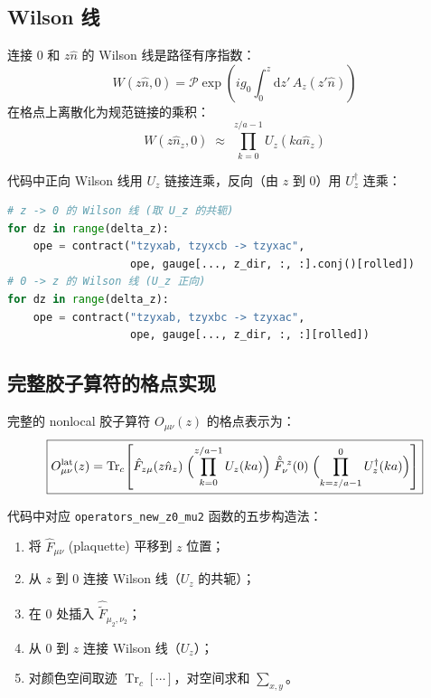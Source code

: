 \documentclass[11pt,a4paper]{ctexart}
\newcommand{\tr}{\operatorname{Tr}}
\begin{document}
\subsection{Wilson 线}

连接 $0$ 和 $z\hat{n}$ 的 Wilson 线是路径有序指数：
\begin{equation}
W(z\hat{n}, 0) = \mathcal{P} \exp\!\left( i g_0 \int_{0}^{z} \mathrm{d}z' \, A_z(z'\hat{n}) \right)
\end{equation}
在格点上离散化为规范链接的乘积：
\begin{equation}\label{eq:wilson_line}
W(z\hat{n}_z, 0) \;\approx\; \prod_{k=0}^{z/a-1} U_z(k a \hat{n}_z)
\end{equation}

代码中正向 Wilson 线用 $U_z$ 链接连乘，反向（由 $z$ 到 $0$）用 $U_z^{\dagger}$ 连乘：
\begin{lstlisting}[language=Python]
# z -> 0 的 Wilson 线 (取 U_z 的共轭)
for dz in range(delta_z):
    ope = contract("tzyxab, tzyxcb -> tzyxac",
                   ope, gauge[..., z_dir, :, :].conj()[rolled])
# 0 -> z 的 Wilson 线 (U_z 正向)
for dz in range(delta_z):
    ope = contract("tzyxab, tzyxbc -> tzyxac",
                   ope, gauge[..., z_dir, :, :][rolled])
\end{lstlisting}

\subsection{完整胶子算符的格点实现}

完整的 nonlocal 胶子算符 $O_{\mu\nu}(z)$ 的格点表示为：
\begin{equation}\label{eq:full_operator}
\boxed{
O_{\mu\nu}^{\text{lat}}(z) = \tr_c\!\left[
\hat{F}_{z\mu}(z\hat{n}_z) \;
\Bigl( \prod_{k=0}^{z/a-1} U_z(k a) \Bigr) \;
\hat{\tilde{F}}_{\nu}^{\;z}(0) \;
\Bigl( \prod_{k=z/a-1}^{0} U_z^{\dagger}(k a) \Bigr)
\right]
}
\end{equation}

代码中对应 \texttt{operators\_new\_z0\_mu2} 函数的五步构造法：
\begin{enumerate}
  \item 将 $\hat{F}_{\mu\nu}$ (plaquette) 平移到 $z$ 位置；
  \item 从 $z$ 到 $0$ 连接 Wilson 线（$U_z$ 的共轭）；
  \item 在 $0$ 处插入 $\hat{\tilde{F}}_{\mu_2,\nu_2}$；
  \item 从 $0$ 到 $z$ 连接 Wilson 线（$U_z$）；
  \item 对颜色空间取迹 $\tr_c[\cdots]$，对空间求和 $\sum_{x,y}$。
\end{enumerate}
\end{document}
